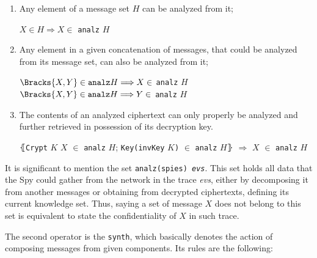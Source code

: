 \begin{enumerate}
  \item Any element of a message set $H$ can be analyzed from it;
  \begin{center}
    $X \in H \Longrightarrow X \in$ \texttt{analz} $H$
  \end{center}

  \item Any element in a given concatenation of messages, that could be analyzed from its message set, can also be analyzed from it;
  \begin{center}
    $\Bracks{X,Y} \in \texttt{analz} H \Longrightarrow X \in$ \texttt{analz} $H$ \\
    $\Bracks{X,Y} \in \texttt{analz} H \Longrightarrow Y \in$ \texttt{analz} $H$
  \end{center}

  \item The contents of an analyzed ciphertext can only properly be analyzed and further retrieved in possession of its decryption key.
  \begin{center}
    $\lBrace$\texttt{Crypt} $K$ $X$ $\in$ \texttt{analz} $H$; \texttt{Key(invKey} $K$\texttt{)} $\in$ \texttt{analz} $H\rBrace$ $\Longrightarrow$ $X$ $\in$ \texttt{analz} $H$
  \end{center}
\end{enumerate}

It is significant to mention the set \texttt{analz(spies) \textit{evs}}. This set holds all data that the Spy could gather from the network in the trace \textit{evs}, either by decomposing it from another messages or obtaining from decrypted ciphertexts, defining its current knowledge set. Thus, saying a set of message $X$ does not belong to this set is equivalent to state the confidentiality of $X$ in such trace.

The second operator is the \texttt{synth}, which basically denotes the action of composing messages from given components. Its rules are the following:

